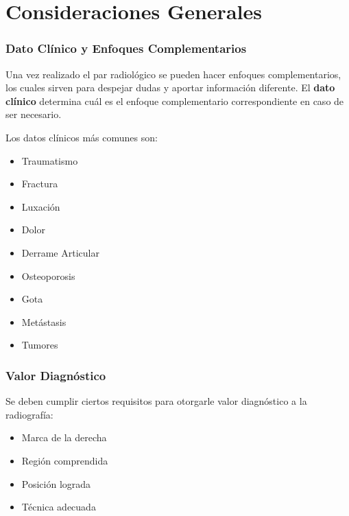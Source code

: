 	
	\chapter{Consideraciones Generales}
	
	\subsection{Dato Clínico y Enfoques Complementarios}
	
	Una vez realizado el par radiológico se pueden hacer enfoques complementarios,
	los cuales sirven para despejar dudas y aportar información diferente. El
	\textbf{dato clínico} determina cuál es el enfoque complementario correspondiente
	en caso de ser necesario.
	
	Los datos clínicos más comunes son:
	\begin{itemize}
		\item Traumatismo
		\item Fractura
		\item Luxación
		\item Dolor
		\item Derrame Articular
		\item Osteoporosis
		\item Gota
		\item Metástasis
		\item Tumores
	\end{itemize}
	
	\subsection{Valor Diagnóstico}
	
	Se deben cumplir ciertos requisitos para otorgarle valor diagnóstico a la
	radiografía:
	
	\begin{itemize}
		\item Marca de la derecha
		\item Región comprendida
		\item Posición lograda
		\item Técnica adecuada
	\end{itemize}
	

